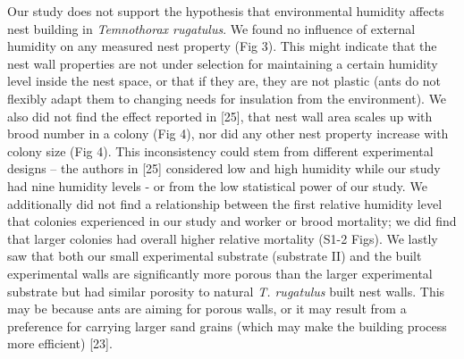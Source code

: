 \documentclass[3p]{elsarticle} %
\begin{document}
Our study does not support the hypothesis that environmental humidity
affects nest building in \emph{Temnothorax rugatulus}. We found no
influence of external humidity on any measured nest property (Fig 3).
This might indicate that the nest wall properties are not under
selection for maintaining a certain humidity level inside the nest
space, or that if they are, they are not plastic (ants do not flexibly
adapt them to changing needs for insulation from the environment). We
also did not find the effect reported in {[}25{]}, that nest wall area
scales up with brood number in a colony (Fig 4), nor did any other nest
property increase with colony size (Fig 4). This inconsistency could
stem from different experimental designs -- the authors in {[}25{]}
considered low and high humidity while our study had nine humidity
levels - or from the low statistical power of our study. We additionally
did not find a relationship between the first relative humidity level
that colonies experienced in our study and worker or brood mortality; we
did find that larger colonies had overall higher relative mortality
(S1-2 Figs). We lastly saw that both our small experimental substrate
(substrate II) and the built experimental walls are significantly more
porous than the larger experimental substrate but had similar porosity
to natural \emph{T. rugatulus} built nest walls. This may be because
ants are aiming for porous walls, or it may result from a preference for
carrying larger sand grains (which may make the building process more
efficient) {[}23{]}.
\end{document}
